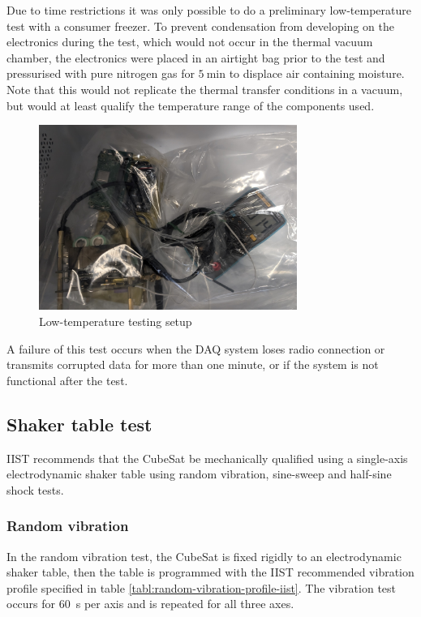 \documentclass[]{report}
\begin{document}
Due to time restrictions it was only possible to do a preliminary low-temperature test with a consumer freezer. To prevent condensation from developing on the electronics during the test, which would not occur in the thermal vacuum chamber, the electronics were placed in an airtight bag prior to the test and pressurised with pure nitrogen gas for $\SI{5}{\minute}$ to displace air containing moisture. Note that this would not replicate the thermal transfer conditions in a vacuum, but would at least qualify the temperature range of the components used.

\begin{figure}[H]
  \centering
  \includegraphics[width=0.75\textwidth]{images/fridge_test.jpg}
  \caption{Low-temperature testing setup}
  \label{fig:temperature-testing-fridge}
\end{figure}

A failure of this test occurs when the DAQ system loses radio connection or transmits corrupted data for more than one minute, or if the system is not functional after the test.

\subsection{Shaker table test}
\label{sec:shaker-table-test}

IIST recommends that the CubeSat be mechanically qualified using a single-axis electrodynamic shaker table using random vibration, sine-sweep and half-sine shock tests.

\subsubsection{Random vibration}

In the random vibration test, the CubeSat is fixed rigidly to an electrodynamic shaker table, then the table is programmed with the IIST recommended vibration profile specified in table \ref{tabl:random-vibration-profile-iist}. The vibration test occurs for \SI{60}{\second} per axis and is repeated for all three axes.
\end{document}
